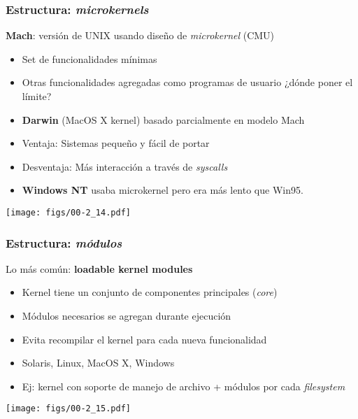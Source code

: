\documentclass[letter]{beamer}
\begin{document}
\begin{frame}
  \frametitle{Estructura: {\em microkernels}}

  {\bf Mach}: versión de UNIX usando diseño de {\em microkernel} (CMU)
  
  \begin{itemize}
    \item Set de funcionalidades mínimas
    \item Otras funcionalidades agregadas como programas de usuario ¿dónde poner el límite?
    \item<2-> {\bf Darwin} (MacOS X kernel) basado parcialmente en modelo Mach
    \item<3-> Ventaja: Sistemas pequeño y fácil de portar
    \item<4-> Desventaja: Más interacción a través de {\em syscalls}
    \item<4-> {\bf Windows NT} usaba microkernel pero era más lento que Win95.
  \end{itemize}

  \begin{center}
    \texttt{[image: figs/00-2\_14.pdf]}
  \end{center}

\end{frame}

\begin{frame}
  \frametitle{Estructura: {\em módulos}}

  Lo más común: {\bf loadable kernel modules}
  \begin{itemize}
    \item Kernel tiene un conjunto de componentes principales ({\em core})
    \item Módulos necesarios se agregan durante ejecución
    \item Evita recompilar el kernel para cada nueva funcionalidad
    \item Solaris, Linux, MacOS X, Windows
    \item Ej: kernel con soporte de manejo de archivo + módulos por cada {\em filesystem}
  \end{itemize}

  \begin{center}
    \texttt{[image: figs/00-2\_15.pdf]}
  \end{center}


\end{frame}
\end{document}
